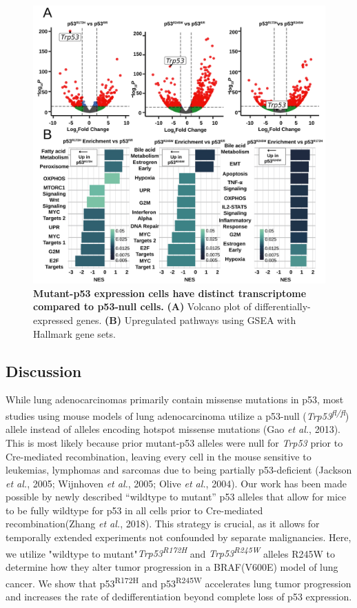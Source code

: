 \begin{figure}
\hypertarget{fig:04}{%
\centering
\includegraphics[width=1\textwidth,height=\textheight]{images/figure4_021722.svg}
\caption{\textbf{Mutant-p53 expression cells have distinct transcriptome compared to p53-null cells.} \textbf{(A)} Volcano plot of differentially-expressed genes. \textbf{(B)} Upregulated pathways using GSEA with Hallmark gene sets.}\label{fig:04}
}
\end{figure}

\hypertarget{discussion}{%
\subsection{Discussion}\label{discussion}}

While lung adenocarcinomas primarily contain missense mutations in p53, most studies using mouse models of lung adenocarcinoma utilize a p53-null (\emph{Trp53\textsuperscript{fl/fl}}) allele instead of alleles encoding hotspot missense mutations (Gao \emph{et al.}, 2013). This is most likely because prior mutant-p53 alleles were null for \emph{Trp53} prior to Cre-mediated recombination, leaving every cell in the mouse sensitive to leukemias, lymphomas and sarcomas due to being partially p53-deficient (Jackson \emph{et al.}, 2005; Wijnhoven \emph{et al.}, 2005; Olive \emph{et al.}, 2004). Our work has been made possible by newly described ``wildtype to mutant'' p53 alleles that allow for mice to be fully wildtype for p53 in all cells prior to Cre-mediated recombination(Zhang \emph{et al.}, 2018). This strategy is crucial, as it allows for temporally extended experiments not confounded by separate malignancies. Here, we utilize "wildtype to mutant"\emph{Trp53\textsuperscript{R172H}} and \emph{Trp53\textsuperscript{R245W}} alleles R245W to determine how they alter tumor progression in a BRAF(V600E) model of lung cancer. We show that p53\textsuperscript{R172H} and p53\textsuperscript{R245W} accelerates lung tumor progression and increases the rate of dedifferentiation beyond complete loss of p53 expression.

